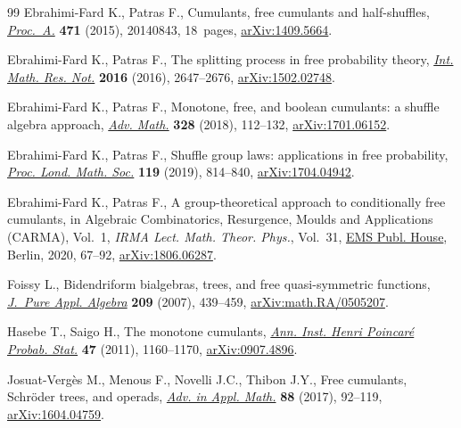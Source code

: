 \documentclass[11pt]{article}
\numberwithin{equation}{section}
\numberwithin{equation}{section}
\begin{document}
\begin{thebibliography}{99}
Ebrahimi-Fard K., Patras F., Cumulants, free cumulants and half-shuffles,
 \href{https://doi.org/10.1098/rspa.2014.0843}{\textit{Proc.~A.}} \textbf{471} (2015), 20140843, 18~pages,
 \href{https://arxiv.org/abs/1409.5664}{arXiv:1409.5664}.

Ebrahimi-Fard K., Patras F., The splitting process in free probability theory,
 \href{https://doi.org/10.1093/imrn/rnv209}{\textit{Int. Math. Res. Not.}} \textbf{2016} (2016), 2647--2676,
 \href{https://arxiv.org/abs/1502.02748}{arXiv:1502.02748}.

Ebrahimi-Fard K., Patras F., Monotone, free, and boolean cumulants: a shuffle
 algebra approach, \href{https://doi.org/10.1016/j.aim.2018.01.003}{\textit{Adv. Math.}} \textbf{328} (2018), 112--132,
 \href{https://arxiv.org/abs/1701.06152}{arXiv:1701.06152}.

Ebrahimi-Fard K., Patras F., Shuffle group laws: applications in free
 probability, \href{https://doi.org/10.1112/plms.12249}{\textit{Proc. Lond. Math. Soc.}} \textbf{119} (2019), 814--840,
 \href{https://arxiv.org/abs/1704.04942}{arXiv:1704.04942}.

Ebrahimi-Fard K., Patras F., A group-theoretical approach to conditionally free
 cumulants, in Algebraic Combinatorics, Resurgence, Moulds and Applications
 ({CARMA}), {V}ol.~1, \textit{IRMA Lect. Math. Theor. Phys.}, Vol.~31, \href{https://doi.org/10.4171/204-1/3}{EMS
 Publ. House}, Berlin, 2020, 67--92, \href{https://arxiv.org/abs/1806.06287}{arXiv:1806.06287}.

Foissy L., Bidendriform bialgebras, trees, and free quasi-symmetric functions,
 \href{https://doi.org/10.1016/j.jpaa.2006.06.005}{\textit{J.~Pure Appl. Algebra}} \textbf{209} (2007), 439--459,
 \href{https://arxiv.org/abs/math.RA/0505207}{arXiv:math.RA/0505207}.

Hasebe T., Saigo H., The monotone cumulants, \href{https://doi.org/10.1214/10-AIHP379}{\textit{Ann. Inst. Henri
 Poincar\'e Probab. Stat.}} \textbf{47} (2011), 1160--1170, \href{https://arxiv.org/abs/0907.4896}{arXiv:0907.4896}.

Josuat-Verg\`es M., Menous F., Novelli J.C., Thibon J.Y., Free cumulants,
 {S}chr\"oder trees, and operads, \href{https://doi.org/10.1016/j.aam.2017.02.002}{\textit{Adv. in Appl. Math.}} \textbf{88}
 (2017), 92--119, \href{https://arxiv.org/abs/1604.04759}{arXiv:1604.04759}.


\end{thebibliography}
\end{document}
